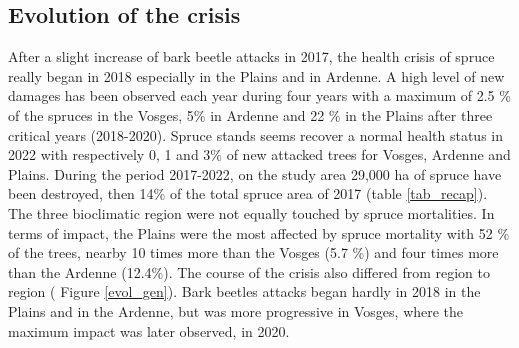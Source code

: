 \documentclass[3p,procedia]{elsarticle}
\begin{document}
\subsection{Evolution of the crisis}

After a slight increase of bark beetle attacks in 2017, the health crisis of spruce really began in 2018 especially in the Plains and in Ardenne.
A high level of new damages has been observed each year during four years with a maximum of 2.5 \% of the spruces in the Vosges, 5\% in Ardenne and 22 \% in the Plains after three critical years (2018-2020).
Spruce stands seems recover a normal health status in 2022 with respectively 0, 1 and 3\% of new attacked trees for Vosges, Ardenne and Plains.
During the period 2017-2022, on the study area 29,000 ha of spruce have been destroyed, then 14\%  of the total spruce area of 2017 (table \ref{tab_recap}).
The three bioclimatic region were not equally touched by spruce mortalities.
In terms of impact, the Plains were the most affected by spruce mortality with 52 \% of the trees,  nearby 10 times more than the Vosges (5.7 \%) and four times more than the Ardenne (12.4\%).
The course of the crisis also differed from region to region (  Figure \ref{evol_gen}).
Bark beetles attacks began hardly in 2018 in the Plains and in the Ardenne, but was more progressive in Vosges, where the maximum impact was later observed, in 2020.
\end{document}
